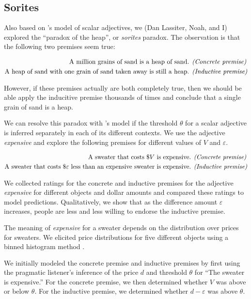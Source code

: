\documentclass{article}
\newcommand{\w}[1]{\emph{#1}}
\newcommand{\s}[1]{``#1''}
\begin{document}
   \subsection{Sorites}

   Also based on 's model of scalar adjectives, we (Dan Lassiter, Noah, and I) explored the ``paradox of the heap'', or \emph{sorites} paradox.
   The observation is that the following two premises seem true:

   \begin{align*}
   \text{A million grains of sand is a heap of sand. }&\text{\emph{(Concrete premise)}} \\
   \text{A heap of sand with one grain of sand taken away is still a heap. }&\text{\emph{(Inductive premise)}}
   \end{align*}

   However, if these premises actually are both completely true, then we should be able apply the inducitive premise thousands of times and conclude that a single grain of sand is a heap.

   We can resolve this paradox with 's model if the threshold $\theta$ for a scalar adjective is inferred separately in each of its different contexts.
   We use the adjective \w{expensive} and explore the following premises for different values of $V$ and $\varepsilon$.

   \begin{align*}
   \text{A sweater that costs \$$V$ is expensive. }&\text{\emph{(Concrete premise)}} \\
   \text{A sweater that costs \$$\varepsilon$ less than an expensive sweater is expensive. }&\text{\emph{(Inductive premise)}}
   \end{align*}

   We collected ratings for the concrete and inductive premises for the adjective \w{expensive} for different objects and dollar amounts and compared these ratings to model predictions.
   Qualitatively, we show that as the difference amount $\varepsilon$ increases, people are less and less willing to endorse the inductive premise.

   The meaning of \w{expensive} for a sweater depends on the distribution over prices for sweaters.
   We elicited price distributions for five different objects using a binned histogram method \cite{franke2016cogsci}.

   We initially modeled the concrete premise and inductive premises by first using the pragmatic listener's inference of the price $d$ and threshold $\theta$ for \s{The sweater is expensive.}
   For the concrete premise, we then determined whether $V$ was above or below $\theta$.
   For the inductive premise, we determined whether $d-\varepsilon$ was above $\theta$.
\end{document}
